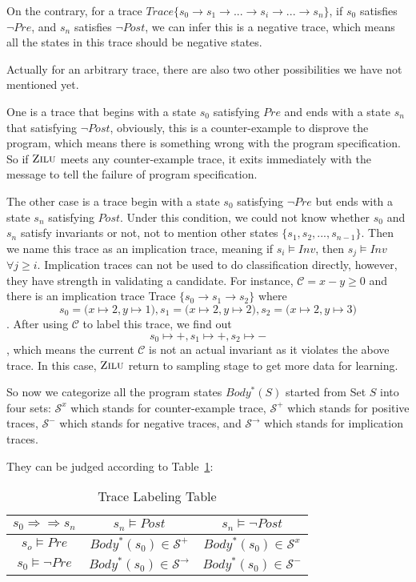 On the contrary, for a trace $Trace\{s_0 \to s_1 \to ...\to s_i \to ... \to s_n\}$, 
if $s_0$ satisfies $\neg Pre$, and $s_n$ satisfies $\neg Post$,
we can infer this is a negative trace, 
which means all the states in this trace should be negative states.  

Actually for an arbitrary trace, there are also two other possibilities we have not mentioned yet.

One is a trace that begins with a state $s_0$ satisfying $Pre$ and ends with a state $s_n$ that satisfying $\neg Post$,
obviously, this is a counter-example to disprove the program,
which means there is something wrong with the program specification.
So if $\textsc{Zilu}$ meets any counter-example trace, 
it exits immediately with the message to tell the failure of program specification. 

The other case is a trace begin with a state $s_0$ satisfying $\neg Pre$ but ends with a state $s_n$ satisfying $Post$.
Under this condition, we could not know whether $s_0$ and $s_n$ satisfy invariants or not,
not to mention other states $\{s_1, s_2, ..., s_{n-1}\}$.
Then we name this trace as an implication trace, meaning if $s_i \models Inv$, then $s_j \models Inv$ $\forall j \ge i$.
Implication traces can not be used to do classification directly, 
however, they have strength in validating a candidate.
For instance, $\mathcal{C} = x - y \ge 0$ and there is an implication trace 
Trace $\{s_0 \to s_1 \to s_2\}$ where 
$$s_0 = \big(x \mapsto 2, y \mapsto 1\big),  s_1 = \big(x \mapsto 2, y \mapsto 2\big),  s_2 = \big(x \mapsto 2, y \mapsto 3\big)$$.
After using $\mathcal{C}$ to label this trace, we find out $$s_0 \mapsto +,  s_1 \mapsto +,  s_2 \mapsto -$$, 
which means the current $\mathcal{C}$ is not an actual invariant as it violates the above trace.
In this case, $\textsc{Zilu}$ return to sampling stage to get more data for learning.


So now we categorize all the program states $Body^*(S)$ started from Set $S$ into four sets:
$\mathcal{S}^x$ which stands for counter-example trace, 
$\mathcal{S}^+$ which stands for positive traces, 
$\mathcal{S}^-$ which stands for negative traces, 
and $\mathcal{S}^\rightarrow$ which stands for implication traces.

They can be judged according to Table~\ref{LabelingTable}: 
\begin{table}[htb]
\label{LabelingTable}
\centering
\caption{Trace Labeling Table}
\begin{tabular}[float]{|c|c|c|}
\hline
$s_0 \Rightarrow \Rightarrow s_n$ & $s_n \models Post$            & $s_n \models \neg Post$\\
\hline
$s_o \models Pre$                 & $Body^*(s_0) \in \mathcal{S}^+$       & $Body^*(s_0) \in \mathcal{S}^x$\\
\hline
$s_0 \models \neg Pre$            & $Body^*(s_0) \in \mathcal{S}^\rightarrow$       & $Body^*(s_0) \in \mathcal{S}^-$\\
\hline
\end{tabular}
\end{table}



